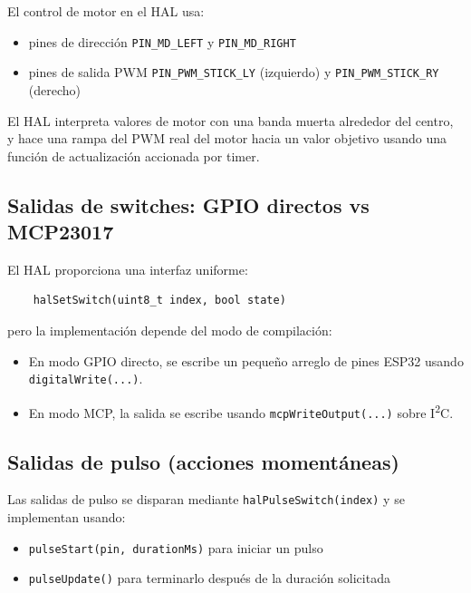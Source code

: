 El control de motor en el HAL usa:

\begin{itemize}
    \item pines de dirección \texttt{PIN\_MD\_LEFT} y \texttt{PIN\_MD\_RIGHT}
    \item pines de salida PWM \texttt{PIN\_PWM\_STICK\_LY} (izquierdo) y \texttt{PIN\_PWM\_STICK\_RY} (derecho)
\end{itemize}

El HAL interpreta valores de motor con una banda muerta alrededor del centro, y hace una rampa del PWM real del motor
hacia un valor objetivo usando una función de actualización accionada por timer.

\subsection{Salidas de switches: GPIO directos vs MCP23017}
\label{subsec:control-hal-hal-switches}

El HAL proporciona una interfaz uniforme:

\begin{verbatim}
    halSetSwitch(uint8_t index, bool state)
\end{verbatim}

pero la implementación depende del modo de compilación:

\begin{itemize}
    \item En modo GPIO directo, se escribe un pequeño arreglo de pines ESP32 usando \texttt{digitalWrite(...)}.
    \item En modo MCP, la salida se escribe usando \texttt{mcpWriteOutput(...)} sobre I\textsuperscript{2}C.
\end{itemize}

\subsection{Salidas de pulso (acciones momentáneas)}
\label{subsec:control-hal-hal-pulses}

Las salidas de pulso se disparan mediante \texttt{halPulseSwitch(index)} y se implementan usando:

\begin{itemize}
    \item \texttt{pulseStart(pin, durationMs)} para iniciar un pulso
    \item \texttt{pulseUpdate()} para terminarlo después de la duración solicitada
\end{itemize}

